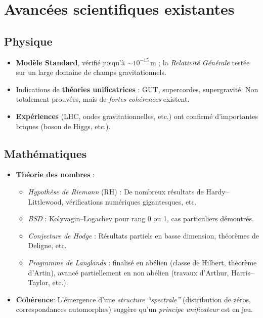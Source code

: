 \documentclass[11pt]{article}
\begin{document}
\section{Avancées scientifiques existantes}

\subsection{Physique}
\begin{itemize}
  \item \textbf{Modèle Standard}, vérifié jusqu'à $\sim 10^{-15}$\,m ; la \emph{Relativité Générale} testée sur un large domaine de champs gravitationnels.
  \item Indications de \textbf{théories unificatrices} : GUT, supercordes, supergravité. Non totalement prouvées, mais de \emph{fortes cohérences} existent.
  \item \textbf{Expériences} (LHC, ondes gravitationnelles, etc.) ont confirmé d'importantes briques (boson de Higgs, etc.).
\end{itemize}

\subsection{Mathématiques}
\begin{itemize}
  \item \textbf{Théorie des nombres} : 
    \begin{itemize}
      \item \emph{Hypothèse de Riemann} (RH) : De nombreux résultats de Hardy--Littlewood, vérifications numériques gigantesques, etc.
      \item \emph{BSD} : Kolyvagin--Logachev pour rang 0 ou 1, cas particuliers démontrés.
      \item \emph{Conjecture de Hodge} : Résultats partiels en basse dimension, théorèmes de Deligne, etc.
      \item \emph{Programme de Langlands} : finalisé en abélien (classe de Hilbert, théorème d'Artin), avancé partiellement en non abélien (travaux d'Arthur, Harris--Taylor, etc.).
    \end{itemize}
  \item \textbf{Cohérence}: L'émergence d'une \emph{structure “spectrale”} (distribution de zéros, correspondances automorphes) suggère qu'un \emph{principe unificateur} est en jeu.
\end{itemize}
\end{document}
